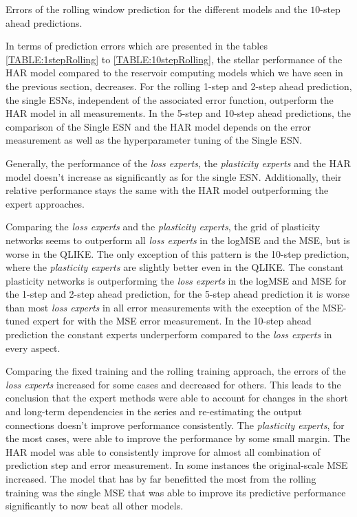\begin{table}
    \begin{center}
        
    \end{center}
    \caption{Errors of the rolling window prediction for the different models and the $10$-step ahead predictions.}
    \label{TABLE:10stepRolling}
\end{table}

In terms of prediction errors which are presented in the tables \ref{TABLE:1stepRolling} to \ref{TABLE:10stepRolling}, the stellar performance of the HAR model compared to the reservoir computing models which we have seen in the previous section, decreases. For the rolling 1-step and 2-step ahead prediction, the single ESNs, independent of the associated error function, outperform the HAR model in all measurements. In the 5-step and 10-step ahead predictions, the comparison of the Single ESN and the HAR model depends on the error measurement as well as the hyperparameter tuning of the Single ESN.

Generally, the performance of the \textit{loss experts}, the \textit{plasticity experts} and the HAR model doesn't increase as significantly as for the single ESN. Additionally, their relative performance stays the same with the HAR model outperforming the expert approaches.

Comparing the \textit{loss experts} and the \textit{plasticity experts}, the grid of plasticity networks seems to outperform all \textit{loss experts} in the logMSE and the MSE, but is worse in the QLIKE. The only exception of this pattern is the 10-step prediction, where the \textit{plasticity experts} are slightly better even in the QLIKE. The constant plasticity networks is outperforming the \textit{loss experts} in the logMSE and MSE for the 1-step and 2-step ahead prediction, for the 5-step ahead prediction it is worse than most \textit{loss experts} in all error measurements with the execption of the MSE-tuned expert for with the MSE error measurement. In the 10-step ahead prediction the constant experts underperform compared to the \textit{loss experts} in every aspect.

Comparing the fixed training and the rolling training approach, the errors of the \textit{loss experts} increased for some cases and decreased for others. This leads to the conclusion that the expert methods were able to account for changes in the short and long-term dependencies in the series and re-estimating the output connections doesn't improve performance consistently. The \textit{plasticity experts}, for the most cases, were able to improve the performance by some small margin. The HAR model was able to consistently improve for almost all combination of prediction step and error measurement. In some instances the original-scale MSE increased. The model that has by far benefitted the most from the rolling training was the single MSE that was able to improve its predictive performance significantly to now beat all other models.




